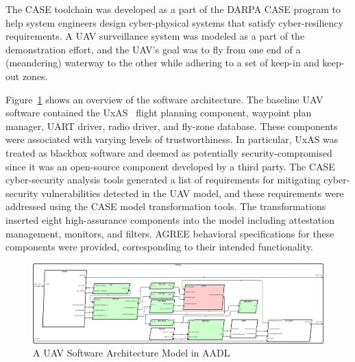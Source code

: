 

 
The CASE toolchain was developed as a part of the DARPA CASE program to help system engineers design cyber-physical systems that satisfy cyber-resiliency requirements.
A UAV surveillance system was modeled as a part of the demonstration effort,
and the UAV's goal was to fly from one end of a (meandering) waterway to the other while adhering to a set of keep-in and keep-out zones.

Figure~\ref{SW} shows an overview of the software architecture.
The baseline UAV software contained the UxAS~\cite{uxas} flight planning component, waypoint plan manager, UART driver, radio driver, and fly-zone database.
These components were associated with varying levels of trustworthiness.
In particular, UxAS was treated as blackbox software and deemed as potentially security-compromised since it was an open-source component developed by a third party.
The CASE cyber-security analysis tools generated a list of requirements for mitigating cyber-security vulnerabilities detected in the UAV model,
and these requirements were addressed using the CASE model transformation tools.
The transformations inserted eight high-assurance components into the model including attestation management, monitors, and filters.
AGREE behavioral specifications for these components were provided, corresponding to their intended functionality.

\begin{figure}[ht!]
\centering
\includegraphics[width=120mm]{sw3.png}
\caption{A UAV Software Architecture Model in AADL \label{SW}}
\end{figure}

